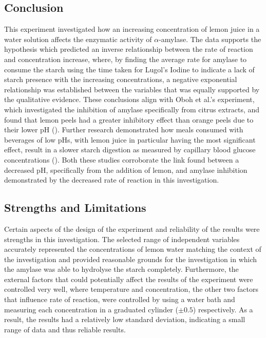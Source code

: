 \documentclass[12pt]{article}
\begin{document}
\subsection{Conclusion}

This experiment investigated how an increasing concentration of lemon juice in a water solution affects the enzymatic activity of $\alpha$-amylase. The data supports the hypothesis which predicted an inverse relationship between the rate of reaction and concentration increase, where, by finding the average rate for amylase to consume the starch using the time taken for Lugol's Iodine to indicate a lack of starch presence with the increasing concentrations, a negative exponential relationship was established between the variables that was equally supported by the qualitative evidence. These conclusions align with Oboh et al.'s experiment, which investigated the inhibition of amylase specifically from citrus extracts, and found that lemon peels had a greater inhibitory effect than orange peels due to their lower pH (\citeauthor{oboh_olasehinde_ademosun_2017}). Further research demonstrated how meals consumed with beverages of low pHs, with lemon juice in particular having the most significant effect, result in a slower starch digestion as measured by capillary blood glucose concentrations (\citeauthor{freitas_le_feunteun_2019}). Both these studies corroborate the link found between a decreased pH, specifically from the addition of lemon, and amylase inhibition demonstrated by the decreased rate of reaction in this investigation. 

\subsection{Strengths and Limitations}

Certain aspects of the design of the experiment and reliability of the results were strengths in this investigation. The selected range of independent variables accurately represented the concentrations of lemon water matching the context of the investigation and provided reasonable grounds for the investigation in which the amylase was able to hydrolyse the starch completely. Furthermore, the external factors that could potentially affect the results of the experiment were controlled very well, where temperature and concentration, the other two factors that influence rate of reaction, were controlled by using a water bath and measuring each concentration in a graduated cylinder ($\pm 0.5$) respectively. As a result, the results had a relatively low standard deviation, indicating a small range of data and thus reliable results. 
\end{document}

